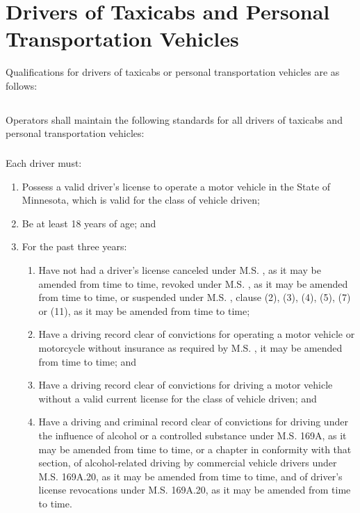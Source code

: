 \section{Drivers of Taxicabs and Personal Transportation Vehicles}
Qualifications for drivers of taxicabs or personal transportation vehicles are as follows:
\subsection{}
Operators shall maintain the following standards for all drivers of taxicabs and personal transportation vehicles:
\subsubsection{}
Each driver must:
\begin{enumerate}[{\indent}a)]
    \item Possess a valid driver’s license to operate a motor vehicle in the State of Minnesota, which is valid for the class of vehicle driven;
    \item Be at least 18 years of age; and
    \item For the past three years:
        \begin{enumerate}[{\indent}i)]
            \item Have not had a driver’s license canceled under M.S. , as it may be amended from time to time, revoked under M.S. , as it may be amended from time to time, or suspended under M.S. , clause (2), (3), (4), (5), (7) or (11), as it may be amended from time to time;
            \item Have a driving record clear of convictions for operating a motor vehicle or motorcycle without insurance as required by M.S. , it may be amended from time to time; and
            \item Have a driving record clear of convictions for driving a motor vehicle without a valid current license for the class of vehicle driven; and
            \item Have a driving and criminal record clear of convictions for driving under the influence of alcohol or a controlled substance under M.S. \textsection 169A, as it may be amended from time to time, or a chapter in conformity with that section, of alcohol-related driving by commercial vehicle drivers under M.S. \textsection 169A.20, as it may be amended from time to time, and of driver’s license revocations under M.S. \textsection 169A.20, as it may be amended from time to time.
        \end{enumerate}
\end{enumerate}
